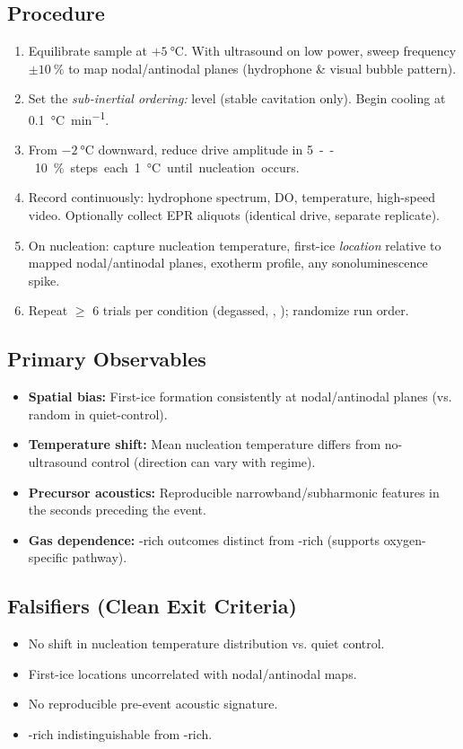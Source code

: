 \documentclass[12pt,oneside]{memoir}
\theoremstyle{plain}
\theoremstyle{definition}
\theoremstyle{remark}
\begin{document}
\subsection*{Procedure}
\begin{enumerate}[leftmargin=1.2em]
  \item Equilibrate sample at \(+\SI{5}{\celsius}\). With ultrasound on low power, sweep frequency \(\pm \SI{10}{\%}\) to map nodal/antinodal planes (hydrophone \& visual bubble pattern).
  \item Set the \emph{sub-inertial ordering:} level (stable cavitation only). Begin cooling at \SI{0.1}{\celsius\per\minute}.
  \item From \(-\SI{2}{\celsius}\) downward, reduce drive amplitude in \SI{5}--\SI{10}{\%} steps each \SI{1}{\celsius} until nucleation occurs.
  \item Record continuously: hydrophone spectrum, DO, temperature, high-speed video. Optionally collect EPR aliquots (identical drive, separate replicate).
  \item On nucleation: capture nucleation temperature, first-ice \emph{location} relative to mapped nodal/antinodal planes, exotherm profile, any sonoluminescence spike.
  \item Repeat \(\ge\) 6 trials per condition (degassed, , ); randomize run order.
\end{enumerate}

\subsection*{Primary Observables}
\begin{itemize}[leftmargin=1.2em]
  \item \textbf{Spatial bias:} First-ice formation consistently at nodal/antinodal planes (vs. random in quiet-control).
  \item \textbf{Temperature shift:} Mean nucleation temperature differs from no-ultrasound control (direction can vary with regime).
  \item \textbf{Precursor acoustics:} Reproducible narrowband/subharmonic features in the seconds preceding the event.
  \item \textbf{Gas dependence:} -rich outcomes distinct from -rich (supports oxygen-specific pathway).
\end{itemize}

\subsection*{Falsifiers (Clean Exit Criteria)}
\begin{itemize}[leftmargin=1.2em]
  \item No shift in nucleation temperature distribution vs. quiet control.
  \item First-ice locations uncorrelated with nodal/antinodal maps.
  \item No reproducible pre-event acoustic signature.
  \item {}-rich indistinguishable from -rich.
\end{itemize}
\end{document}
